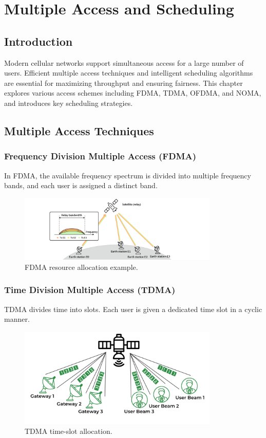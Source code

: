 \chapter{Multiple Access and Scheduling}

\section{Introduction}
Modern cellular networks support simultaneous access for a large number of users. Efficient multiple access techniques and intelligent scheduling algorithms are essential for maximizing throughput and ensuring fairness. This chapter explores various access schemes including FDMA, TDMA, OFDMA, and NOMA, and introduces key scheduling strategies.

\section{Multiple Access Techniques}

\subsection{Frequency Division Multiple Access (FDMA)}
In FDMA, the available frequency spectrum is divided into multiple frequency bands, and each user is assigned a distinct band.

\begin{figure}[H]
    \centering
    \includegraphics[width=0.85\textwidth]{images/fdma_example.png}
    \caption{FDMA resource allocation example.}
\end{figure}

\subsection{Time Division Multiple Access (TDMA)}
TDMA divides time into slots. Each user is given a dedicated time slot in a cyclic manner.

\begin{figure}[H]
    \centering
    \includegraphics[width=0.85\textwidth]{images/tdma_example.png}
    \caption{TDMA time-slot allocation.}
\end{figure}

